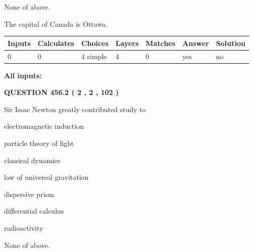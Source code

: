 \documentclass[12pt]{article}
\begin{document}
 
 None of above.
 
 
\noindent{}
 
 
The capital of Canada is Ottawa.
 
 
\noindent{}
 
 
   
   
   
   
\noindent\begin{tabular}{|l|l|l|l|l|l|l|}
 \hline
Inputs & Calculates & Choices & Layers & Matches & Answer & Solution \\ \hline
 0  & 
 0  & 
 4
  simple  
  & 
 4  & 
 0  & 
  yes & 
  no 
  \\ \hline
 \end{tabular}
   
   
   
   
\noindent{}
   
   
   
   
\noindent\vspace{0.1in}\hspace{-0.08in} {\textbf{\Large{All inputs: }}}
   
   
  
\vspace{0.2in}
  
{\textbf{\Large{QUESTION
456.2 
 ( 2 , 2 , 102 )
}}}
  
  
Sir Issac Newton greatly contributed study to
 
 
electromagnetic induction
 
 
particle theory of light
 
 
classical dynamics
 
 
law of universal gravitation
 
 
dispersive prism
 
 
differential calculus
 
 
radioactivity
 
 
 None of above.
 
\end{document}
